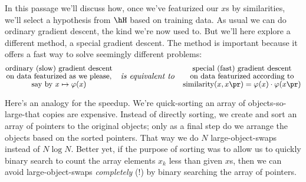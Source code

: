 
\newpage
{}%
  In this passage we'll discuss how, once we've featurized our $x$s by
  similarities, we'll select a hypothesis from $\hH$ based on training data.
  As usual we can do ordinary gradient descent, the kind we're now used to.
  But we'll here explore a different method, a special gradient descent.  The
  method is important because it offers a fast way
  to solve seemingly different problems:
  $$
    \substack{\text{\small ordinary (slow) gradient descent}\\%
              \text{\small on data featurized as we please,}\\%
              \text{\small say by $x\mapsto \varphi(x)$}}
    \quad\text{\emph{is equivalent to}}\quad
    \substack{\text{\small special (fast) gradient descent}\\%
              \text{\small on data featurized according to}\\%
              \text{\small $\text{similarity}(x,x\pr)=\varphi(x)\cdot\varphi(x\pr)$}}
  $$

  Here's an analogy for the speedup.
  We're quick-sorting an array
  of objects-so-large-that copies are expensive.
  Instead of directly sorting, we create and sort an array of pointers to the
  original objects; only as a final step do we arrange the objects based on the
  sorted pointers.  That way we do $N$ large-object-swaps instead of $N\log N$.
  Better yet, if the purpose of sorting was to allow us to quickly binary
  search to count the array elements $x_k$ less than given $x$s,
  then we can avoid large-object-swaps \emph{completely} (!) by binary
  searching the array of pointers.

